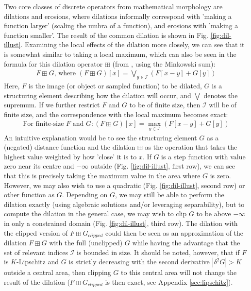 \documentclass[a4paper, 12pt]{report}
\begin{document}
Two core classes of discrete operators from mathematical morphology are dilations and erosions, where dilations informally correspond with 'making a function larger' (scaling the umbra of a function), and erosions with 'making a function smaller'. The result of the common dilation is shown in Fig. \ref{fig:dil-illust}. Examining the local effects of the dilation more closely, we can see that it is somewhat similar to taking a local maximum, which can also be seen in the formula for this dilation operator $\boxplus$  (from \cite{heijmans1996morphological}, using the Minkowski sum): 
\begin{align}
F \boxplus G \textrm{, where }(F \boxplus G)[x] = \bigvee_ {y\in\mathcal{I}} \left(F[x-y] + G[y]\right)	
\end{align}
\noindent
Here, $F$ is the image (or object or sampled function) to be dilated, $G$ is a structuring element describing how the dilation will occur, and $\bigvee$ denotes the supremum. If we further restrict $F$ and $G$ to be of finite size, then $\mathcal{I}$ will be of finite size, and the correspondence with the local maximum becomes exact:
\begin{align}
\textrm{For finite-size }F\textrm{ and }G: (F \boxplus G)[x] = \max_ {y\in\mathcal{I}} \left(F[x-y] + G[y]\right)	
\end{align}
 An intuitive explanation would be to see the structuring element $G$ as a (negated) distance function and the dilation $\boxplus$ as the operation that takes the highest value weighted by how 'close' it is to $x$. If $G$ is a step function with value zero near its centre and $-\infty$ outside (Fig. \ref{fig:dil-illust}, first row), we can see that this is precisely taking the maximum value in the area where $G$ is zero. However, we may also wish to use a quadratic (Fig. \ref{fig:dil-illust}, second row) or other function as $G$. Depending on $G$, we may still be able to perform the dilation exactly (using algebraic solutions and/or leveraging separability), but to compute the dilation in the general case, we may wish to clip $G$ to be above $-\infty$ in only a constrained domain (Fig. \ref{fig:dil-illust}, third row). The dilation with the clipped version of $F\boxplus G_{clipped}$ could then be seen as an approximation of the dilation $F\boxplus G$ with the full (unclipped) $G$ while having the advantage that the set of relevant indices $\mathcal{I}$ is bounded in size. It should be noted, however, that if $F$ is $K$-Lipschitz and $G$ is strictly decreasing with the second derivative $|\delta^2 G|>K$ outside a central area, then clipping $G$ to this central area will not change the result of the dilation ($F\boxplus G_{clipped}$ is then exact, see Appendix \ref{sec:lipschitz}).
\end{document}
